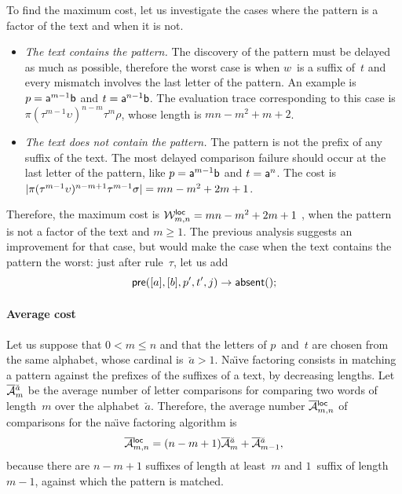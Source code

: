 To find the maximum cost, let us investigate the cases where the
pattern is a factor of the text and when it is not.
\begin{itemize}

  \item \emph{The text contains the pattern.} The discovery of the
    pattern must be delayed as much as possible, therefore the worst
    case is when \(w\)~is a suffix of~\(t\) and every mismatch
    involves the last letter of the pattern. An example is \(p =
    \word{a}^{m-1}\word{b}\) and \(t = \word{a}^{n-1}\word{b}\). The
    evaluation trace corresponding to this case is \(\pi
    (\tau^{m-1}\upsilon)^{n-m} \tau^m\rho\), whose length is
    \(mn-m^2+m+2\).

  \item \emph{The text does not contain the pattern.} The pattern is
    not the prefix of any suffix of the text. The most delayed
    comparison failure should occur at the last letter of the pattern,
    like \(p = \word{a}^{m-1}\word{b}\) and \(t = \word{a}^{n}\). The
    cost is \(\len{\pi(\tau^{m-1}\upsilon)^{n-m+1}\tau^{m-1}\sigma} =
    mn - m^2 + 2m + 1\).

\end{itemize}
Therefore, the maximum cost is \(\W{\fun{loc}}{m,n} = mn - m^2 + 2m +
1\) , when the pattern is not a factor
of the text and \(m \geqslant 1\). The previous analysis suggests an
improvement for that case, but would make the case when the text
contains the pattern the worst: just after rule~\(\tau\), let us add
\begin{equation*}
\fun{pre}([a],[b],p',t',j) \rightarrow \fun{absent}();\index{pre@\fun{pre/5}}
\end{equation*}

\paragraph{Average cost}

Let us suppose that \(0 < m \leqslant n\) and that the letters of
\(p\)~and~\(t\) are chosen from the same alphabet, whose cardinal
is~\(\breve{a} > 1\). Na\"{\i}ve factoring consists in matching a
pattern against the prefixes of the suffixes of a text, by decreasing
lengths. Let~\(\OM{\breve{a}}{m}\)  be
the average number of letter comparisons for comparing two words of
length~\(m\) over the alphabet~\(\breve{a}\). Therefore, the average
number \(\OM{\fun{loc}}{m,n}\) of comparisons for the na\"{\i}ve
factoring algorithm is
\begin{equation}
\OM{\fun{loc}}{m,n} = (n-m+1)\OM{\breve{a}}{m} + \OM{\breve{a}}{m-1},
\label{eq:loc}
\end{equation}
because there are \(n-m+1\) suffixes of length at least~\(m\) and
\(1\)~suffix of length~\(m-1\), against which the pattern is matched.

